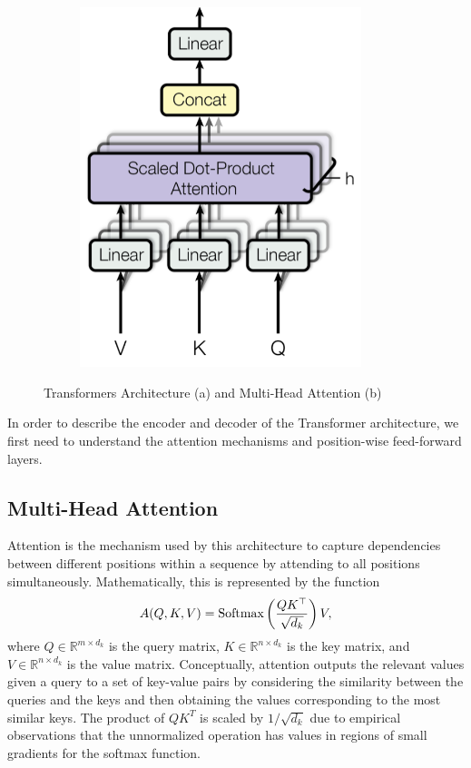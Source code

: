 \begin{figure}[h]
\begin{subfigure}[b]{0.4\textwidth}
    \includegraphics[width=0.9\textwidth]{images/multi-head.png}
    \caption{}
    \label{fig:multi-head}
\end{subfigure}
\caption{Transformers Architecture (a) and Multi-Head Attention (b) \cite{vaswani2023attention}}
\end{figure}

In order to describe the encoder and decoder of the Transformer architecture, we first need to understand the attention mechanisms and position-wise feed-forward layers.

\subsection{Multi-Head Attention}

Attention is the mechanism used by this architecture to capture dependencies between different positions within a sequence by attending to all positions simultaneously. Mathematically, this is represented by the function 
\begin{equation}
    A(Q, K, V) = \text{Softmax}\left(\frac{QK^\top}{\sqrt{d_k}}\right) V,
\end{equation}
where $Q \in \mathbb{R}^{m \times d_k}$ is the query matrix, $K \in \mathbb{R}^{n\times d_k}$ is the key matrix, and $V \in \mathbb{R}^{n \times d_k}$ is the value matrix. Conceptually, attention outputs the relevant values given a query to a set of key-value pairs by considering the similarity between the queries and the keys and then obtaining the values corresponding to the most similar keys. The product of $QK^T$ is scaled by $1/\sqrt{d_k}$ due to empirical observations that the unnormalized operation has values in regions of small gradients for the softmax function.

